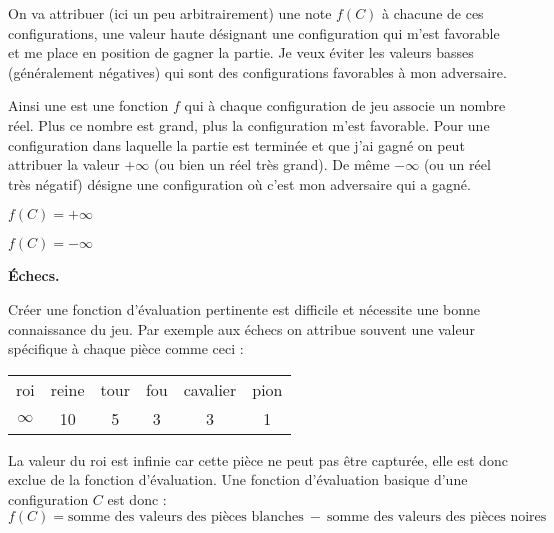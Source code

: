 \documentclass[11pt,class=report,crop=false]{standalone}
\begin{document}
On va attribuer (ici un peu arbitrairement) une note $f(C)$ à chacune de ces configurations, une valeur haute désignant une configuration qui m'est favorable et me place en position de gagner la partie. Je veux éviter les valeurs basses (généralement négatives) qui sont des configurations favorables à mon adversaire. 


Ainsi une  est une fonction $f$ qui à chaque configuration de jeu associe un nombre réel. 
Plus ce nombre est grand, plus la configuration m'est favorable.
Pour une configuration dans laquelle la partie est terminée et que j'ai gagné on peut attribuer la valeur $+\infty$ (ou bien un réel très grand). De même $-\infty$ (ou un réel très négatif) désigne une configuration où c'est mon adversaire qui a gagné.

\begin{center}
\begin{minipage}{0.3\textwidth}
	\center
	
	$f(C) = +\infty$
\end{minipage}	
	\quad
\begin{minipage}{0.3\textwidth}
	\center
	
	$f(C) = -\infty$
\end{minipage}	
\end{center}



\bigskip

\textbf{Échecs.}

Créer une fonction d'évaluation pertinente est difficile et nécessite une bonne connaissance du jeu. Par exemple aux échecs on attribue souvent une valeur spécifique à chaque pièce comme ceci :

\begin{center}
\setlength{\tabcolsep}{20pt}	
	\begin{tabular}{*{6}{c}}
		\Large\symking  & \Large\symqueen & \Large\symrook & \Large\symbishop & \Large\symknight & \Large\sympawn \\ \hline
		roi       & reine     & tour     & fou        & cavalier   & pion     \\ \hline
		$\infty$  & 10        & 5        & 3          & 3          & 1        \\
	\end{tabular}
\end{center}
La valeur du roi est infinie car cette pièce ne peut pas être capturée, elle est donc exclue de la fonction d'évaluation.
Une fonction d'évaluation basique d'une configuration $C$ est donc :
$$f(C) = \text{somme des valeurs des pièces blanches} \ - \ \text{somme des valeurs des pièces noires}$$
\end{document}
